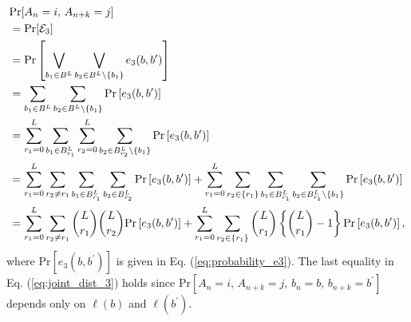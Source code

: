 \documentclass[dvipdfmx,english]{ampmt} %
\begin{document}
\begin{align}\label{eq:joint_dist_3}
\begin{split}
  &\mathrm{Pr} [A_n=i ,\, A_{n+k}=j] \\
  &=\mathrm{Pr} [\mathcal{E}_3] \\
  &= \mathrm{Pr} \left[ \bigvee_{b_1 \in B^L} \bigvee_{b_2 \in B^L \setminus \{b_1\}}
  e_3(b,b^\prime) \right] \\
  &=\sum_{b_1 \in B^L} \sum_{b_2 \in B^{L} \setminus \{ b_1 \}} \mathrm{Pr} \left[ e_3(b,b^\prime) \right] \\
  &= \sum_{r_1=0}^{L} \sum_{b_1 \in B^L_{r_1}} \sum_{r_2=0}^{L} \sum_{b_2 \in B^L_{r_2} \setminus \{ b_1 \}} \mathrm{Pr} \left[ e_3(b,b^\prime) \right] \\
  &= \sum_{r_1=0}^{L} \sum_{r_2 \neq r_1} \sum_{b_1 \in B^L_{r_1}} \sum_{b_2 \in B^L_{r_2}} \mathrm{Pr} \left[e_3(b,b^\prime) \right] 
  + \sum_{r_1=0}^{L} \sum_{r_2 \in \{r_1\}} \sum_{b_1 \in B^L_{r_1}} \sum_{b_2 \in B^L_{r_1} \setminus \{ b_1 \}} \mathrm{Pr} \left[e_3(b,b^\prime) \right] \\
  &= \sum_{r_1=0}^{L} \sum_{r_2 \neq r_1} \dbinom{L}{r_1} \dbinom{L}{r_2} \mathrm{Pr} \left[e_3(b,b^\prime) \right] 
  + \sum_{r_1=0}^{L}\sum_{r_2\in\{r_1\}} \dbinom{L}{r_1} \left\{ \dbinom{L}{r_1} -1 \right\} \mathrm{Pr} \left[e_3(b,b^\prime) \right],
\end{split}
\end{align}
where $\mathrm{Pr} \left[e_3(b,b^\prime) \right]$ is given in Eq. (\ref{eq:probability_e3}).
The last equality in Eq. (\ref{eq:joint_dist_3}) holds since $\mathrm{Pr} [A_n=i ,\, A_{n+k}=j,\,b_n=b,\,b_{n+k}=b^\prime]$ depends only on $\ell (b)$ and $\ell (b^\prime)$.
%
\end{document}
